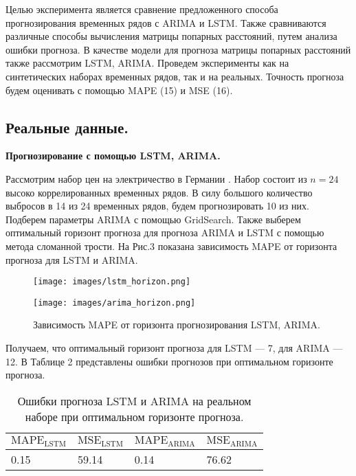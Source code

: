 \documentclass{article}
\begin{document}
Целью эксперимента является сравнение предложенного способа прогнозирования временных рядов с ARIMA и LSTM. Также сравниваются различные способы вычисления матрицы попарных расстояний, путем анализа ошибки прогноза. В качестве модели для прогноза матрицы попарных расстояний также рассмотрим LSTM, ARIMA. Проведем эксперименты как на синтетических наборах временных рядов, так и на реальных. Точность прогноза будем оценивать с помощью MAPE (15) и MSE (16).




\subsection{Реальные данные.}

\textbf{Прогнозирование с помощью LSTM, ARIMA.}

Рассмотрим набор цен на электричество в Германии \cite{dataset}. Набор состоит из $n = 24$ высоко коррелированных временных рядов. В силу большого количество выбросов в 14 из 24 временных рядов, будем прогнозировать 10 из них. Подберем параметры ARIMA с помощью GridSearch. Также выберем оптимальный горизонт прогноза для прогноза ARIMA и LSTM с помощью метода сломанной трости. На Рис.3 показана зависимость MAPE от горизонта прогноза для LSTM и ARIMA. 

\begin{figure}[h]
  \begin{minipage}{0.5\textwidth}
    \centering
    \texttt{[image: images/lstm\_horizon.png]}
  \end{minipage}\hfill
  \begin{minipage}{0.5\textwidth}
    \centering
    \texttt{[image: images/arima\_horizon.png]}
  \end{minipage}
  \caption{Зависимость MAPE от горизонта прогнозирования LSTM, ARIMA.}
\end{figure}

Получаем, что оптимальный горизонт прогноза для LSTM --- 7, для ARIMA --- 12. В Таблице 2 представлены ошибки прогнозов при оптимальном горизонте прогноза.


\begin{table}[h]
\centering
\begin{tabular}{|l|l|l|l|}
\hline  
$\text{MAPE}_{\text{LSTM}}$  & $\text{MSE}_{\text{LSTM}}$  & $\text{MAPE}_{\text{ARIMA}}$ & $\text{MSE}_{\text{ARIMA}}$ \\ \hline
0.15 & 59.14 & 0.14 & 76.62 \\ \hline
\end{tabular}
\caption{Ошибки прогноза LSTM и ARIMA на реальном наборе при оптимальном горизонте прогноза.}
\label{tab:stat_}
\end{table}
\end{document}
